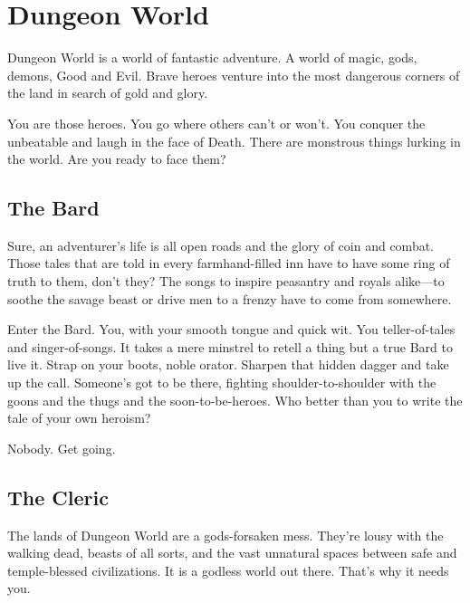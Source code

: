 \chapter{Dungeon World}
   
 



Dungeon World is a world of fantastic adventure. A world of magic, gods, demons, Good and Evil. Brave heroes venture into the most dangerous corners of the land in search of gold and glory.

 

You are those heroes. You go where others can't or won't. You conquer the unbeatable and laugh in the face of Death. There are monstrous things lurking in the world. Are you ready to face them?

 
\section{The Bard}   
 

Sure, an adventurer’s life is all open roads and the glory of coin and combat. Those tales that are told in every farmhand-filled inn have to have some ring of truth to them, don’t they? The songs to inspire peasantry and royals alike—to soothe the savage beast or drive men to a frenzy have to come from somewhere.

 

Enter the Bard. You, with your smooth tongue and quick wit. You teller-of-tales and singer-of-songs. It takes a mere minstrel to retell a thing but a true Bard to live it. Strap on your boots, noble orator. Sharpen that hidden dagger and take up the call. Someone’s got to be there, fighting shoulder-to-shoulder with the goons and the thugs and the soon-to-be-heroes. Who better than you to write the tale of your own heroism?

 

Nobody. Get going.

 
\section{The Cleric}   
 

The lands of Dungeon World are a gods-forsaken mess. They’re lousy with the walking dead, beasts of all sorts, and the vast unnatural spaces between safe and temple-blessed civilizations. It is a godless world out there. That’s why it needs you.


